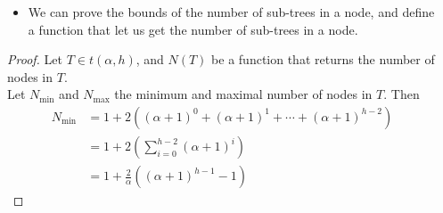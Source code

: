 \documentclass{beamer}
\begin{document}
\begin{frame}
    \framebreak

    \begin{columns}
        \begin{column}{\textlecolumn}
            \begin{block}{}
                \vspace{-0.5cm}
                \begin{itemize}
                    \item We can prove the bounds of the number of sub-trees in a node, and define a function that let us get the number of sub-trees in a node.
                \end{itemize}
                \begin{proof}\renewcommand{\qedsymbol}{}
                    Let \(T \in t\left(\alpha, h\right)\), and \(N(T)\) be a function that returns the number of nodes in \(T\).
                    \\
                    Let \(N_{\text{min}}\) and \(N_{\text{max}}\) the minimum and maximal number of nodes in \(T\). Then
                    \[
                        \begin{aligned}
                            N_{\text{min}} &= 1 + 2\left(\left(\alpha + 1\right)^0 + \left(\alpha + 1\right)^1 + \cdots + \left(\alpha + 1\right)^{h-2} \right) \\
                            & = 1 + 2\left(\sum^{h - 2}_{i = 0} \left(\alpha + 1\right)^i \right) \\
                            & = 1 + \frac{2}{\alpha}\left(\left(\alpha + 1\right)^{h - 1} - 1\right)
                        \end{aligned}
                    \]
                \end{proof}
            \end{block}
        \end{column}
        \begin{column}{\textricolumn}
        \end{column}
    \end{columns}

    \framebreak


\end{frame}
\end{document}
